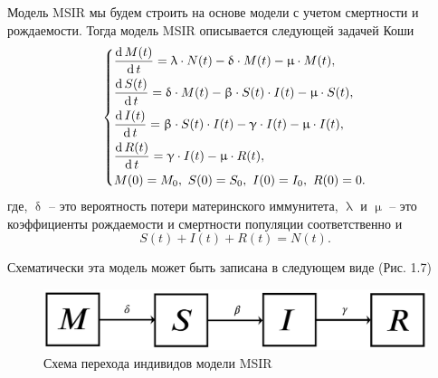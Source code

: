 \documentclass[a4paper, 14pt]{extreport}
\renewcommand{\beta}{\upbeta}
\renewcommand{\gamma}{\upgamma}
\renewcommand{\delta}{\updelta}
\renewcommand{\lambda}{\uplambda}
\renewcommand{\mu}{\upmu}
\renewcommand{\d}{\operatorname{d}}
\begin{document}
	Модель MSIR мы будем строить на основе модели с учетом смертности и рождаемости. Тогда модель MSIR описывается следующей задачей Коши
	\begin{equation}
	\begin{dcases}
	\dfrac {\d M(t)}{\d t} = \lambda \cdot N(t) - \delta\cdot M(t)-\mu\cdot M(t),\\
	\dfrac {\d S(t)}{\d t} = \delta \cdot M(t) -\beta\cdot S(t)\cdot I(t) - \mu \cdot S(t),\\
	\dfrac{\d I(t)}{\d t} =\beta\cdot S(t)\cdot I(t) - \gamma \cdot I(t) - \mu \cdot I(t),\\
	\dfrac{\d R(t)}{\d t} = \gamma\cdot I(t) - \mu \cdot R(t),\\
	M(0) = M_0,\ S(0) = S_0,\ I(0) = I_0,\ R(0) = 0.
	\end{dcases}
	\end{equation}
	где, $\delta$ -- это вероятность потери материнского иммунитета, $\lambda$ и $\mu$ -- это коэффициенты рождаемости и смертности популяции соответственно и $$S(t) + I(t) + R(t) = N(t).$$
	
	Схематически эта модель может быть записана в следующем виде (Рис. 1.7)
	\begin{figure}[h]
		\centering
		\includegraphics[scale=0.3]{images/img09}
		\caption{Схема перехода индивидов модели MSIR}
		\label{fig:img09}
	\end{figure}
	
\end{document}
